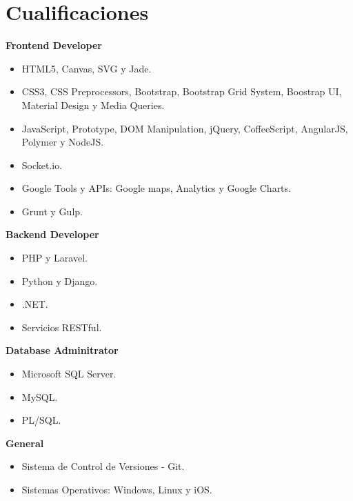 \documentclass[]{friggeri-cv} %
\begin{document}
\section{Cualificaciones}
\textbf{Frontend Developer}
\begin{itemize}
	\item HTML5, Canvas, SVG y Jade.
	\item CSS3, CSS Preprocessors, Bootstrap, Bootstrap Grid System, Boostrap UI, Material Design y Media Queries.
	\item JavaScript, Prototype, DOM Manipulation, jQuery, CoffeeScript, AngularJS, Polymer y NodeJS.
	\item Socket.io.
	\item Google Tools y APIs: Google maps, Analytics y Google Charts.
	\item Grunt y Gulp.

\end{itemize}

\textbf{Backend Developer}

\begin{itemize}
	\item PHP y Laravel.
	\item Python y Django.
	\item .NET.
	\item Servicios RESTful.
	
\end{itemize}

\textbf{Database Adminitrator}
\begin{itemize}
	\item Microsoft SQL Server.
	\item MySQL.
	\item PL/SQL.
\end{itemize}

\textbf{General}
\begin{itemize}
	\item Sistema de Control de Versiones - Git.
	\item Sistemas Operativos: Windows, Linux y iOS.
\end{itemize}



\end{document}
